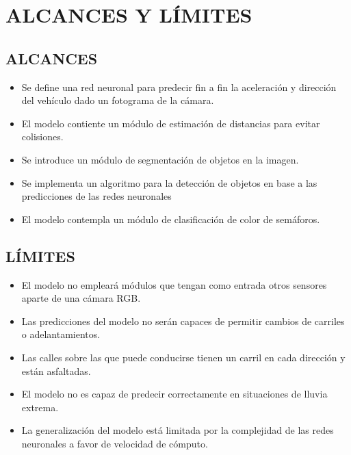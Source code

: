 \section{ALCANCES Y LÍMITES}
	\subsection{ALCANCES}
		\begin{itemize}[nosep]
			\item Se define una red neuronal para predecir fin a fin la aceleración y dirección del vehículo dado un fotograma de la cámara.
			\item El modelo contiente un módulo de estimación de distancias para evitar colisiones.
			\item Se introduce un módulo de segmentación de objetos en la imagen.
			\item Se implementa un algoritmo para la detección de objetos en base a las predicciones de las redes neuronales
			\item El modelo contempla un módulo de clasificación de color de semáforos.
		\end{itemize}
	\subsection{LÍMITES}
		\begin{itemize}[nosep]
			\item El modelo no empleará módulos que tengan como entrada otros sensores aparte de una cámara RGB.
			\item Las predicciones del modelo no serán capaces de permitir cambios de carriles o adelantamientos.
			\item Las calles sobre las que puede conducirse tienen un carril en cada dirección y están asfaltadas.
			\item El modelo no es capaz de predecir correctamente en situaciones de lluvia extrema.
			\item La generalización del modelo está limitada por la complejidad de las redes neuronales a favor de velocidad de cómputo.
		\end{itemize}

